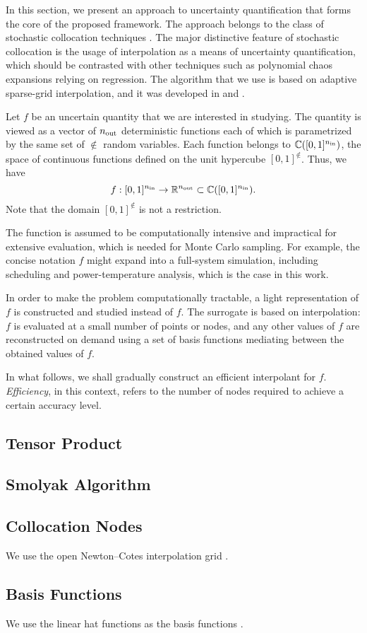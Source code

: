 In this section, we present an approach to uncertainty quantification that forms
the core of the proposed framework. The approach belongs to the class of
stochastic collocation techniques \cite{xiu2010}. The major distinctive feature
of stochastic collocation is the usage of interpolation as a means of
uncertainty quantification, which should be contrasted with other techniques
such as polynomial chaos expansions relying on regression. The algorithm that we
use is based on adaptive sparse-grid interpolation, and it was developed in
\cite{klimke2006} and \cite{ma2009}.

Let $f$ be an uncertain quantity that we are interested in studying. The
quantity is viewed as a vector of ${n_\text{out}}$ deterministic functions each of which
is parametrized by the same set of $\nin$ random variables. Each function
belongs to $\mathbb{C}([0, 1]^{n_\text{in}})$, the space of continuous functions defined
on the unit hypercube $[0, 1]^\nin$. Thus, we have
\[
  f: [0, 1]^{n_\text{in}} \to \mathbb{R}^{n_\text{out}} \subset \mathbb{C}([0, 1]^{n_\text{in}}).
\]
Note that the domain $[0, 1]^\nin$ is not a restriction.

The function is assumed to be computationally intensive and impractical for
extensive evaluation, which is needed for Monte Carlo sampling. For example, the
concise notation $f$ might expand into a full-system simulation, including
scheduling and power-temperature analysis, which is the case in this work.

In order to make the problem computationally tractable, a light representation
of $f$ is constructed and studied instead of $f$. The surrogate is based on
interpolation: $f$ is evaluated at a small number of points or nodes, and any
other values of $f$ are reconstructed on demand using a set of basis functions
mediating between the obtained values of $f$.

In what follows, we shall gradually construct an efficient interpolant for $f$.
\emph{Efficiency}, in this context, refers to the number of nodes required to
achieve a certain accuracy level.

\subsection{Tensor Product}


\subsection{Smolyak Algorithm}


\subsection{Collocation Nodes}
We use the open Newton--Cotes interpolation grid \cite{klimke2006}.

\subsection{Basis Functions}
We use the linear hat functions as the basis functions \cite{klimke2006}.



